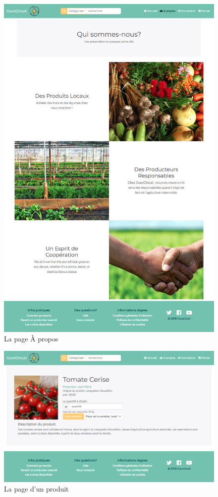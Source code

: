 \documentclass[a4paper,12pt]{report}
\theoremstyle{break}
\theoremstyle{break}
\theoremstyle{break}
\theoremstyle{break}
\theoremstyle{definition}
\theoremstyle{remark}
\begin{document}
\begin{appendices}
\begin{figure}[!ht]
  \centering
  \includegraphics[scale=0.23]{images/about.png}
  \caption{La page À propos}
\end{figure}

\begin{figure}[!ht]
  \centering
  \includegraphics[scale=0.35]{images/produit.png}
  \caption{La page d'un produit}
\end{figure}


\end{appendices}
\end{document}
